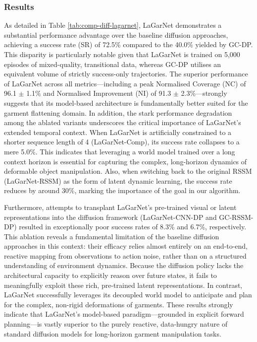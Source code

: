 \documentclass[journal]{IEEEtran}
\begin{document}
\subsubsection{Results} \label{sec:diff-result}

As detailed in Table \ref{tab:comp-diff-lagarnet}, LaGarNet demonstrates a substantial performance advantage over the baseline diffusion approaches, achieving a success rate (SR) of 72.5\% compared to the 40.0\% yielded by GC-DP. This disparity is particularly notable given that LaGarNet is trained on 5,000 episodes of mixed-quality, transitional data, whereas GC-DP utilises an equivalent volume of strictly success-only trajectories. The superior performance of LaGarNet across all metrics—including a peak Normalised Coverage (NC) of 96.1 $\pm$ 1.1\% and Normalised Improvement (NI) of 91.3 $\pm$ 2.3\%—strongly suggests that its model-based architecture is fundamentally better suited for the garment flattening domain. 
In addition, the stark performance degradation among the ablated variants underscores the critical importance of LaGarNet's extended temporal context. When LaGarNet is artificially constrained to a shorter sequence length of 4 (LaGarNet-Comp), its success rate collapses to a mere 5.0\%. This indicates that leveraging a world model trained over a long context horizon is essential for capturing the complex, long-horizon dynamics of deformable object manipulation. Also, when switching back to the original RSSM (LaGarNet-RSSM) as the form of latent dynamic learning, the success rate reduces by around 30\%, marking the importance of the goal in our algorithm.

Furthermore, attempts to transplant LaGarNet's pre-trained visual or latent representations into the diffusion framework (LaGarNet-CNN-DP and GC-RSSM-DP) resulted in exceptionally poor success rates of 8.3\% and 6.7\%, respectively. This ablation reveals a fundamental limitation of the baseline diffusion approaches in this context: their efficacy relies almost entirely on an end-to-end, reactive mapping from observations to action noise, rather than on a structured understanding of environment dynamics. Because the diffusion policy lacks the architectural capacity to explicitly reason over future states, it fails to meaningfully exploit these rich, pre-trained latent representations. In contrast, LaGarNet successfully leverages its decoupled world model to anticipate and plan for the complex, non-rigid deformations of garments. These results strongly indicate that LaGarNet's model-based paradigm—grounded in explicit forward planning—is vastly superior to the purely reactive, data-hungry nature of standard diffusion models for long-horizon garment manipulation tasks.
\end{document}
